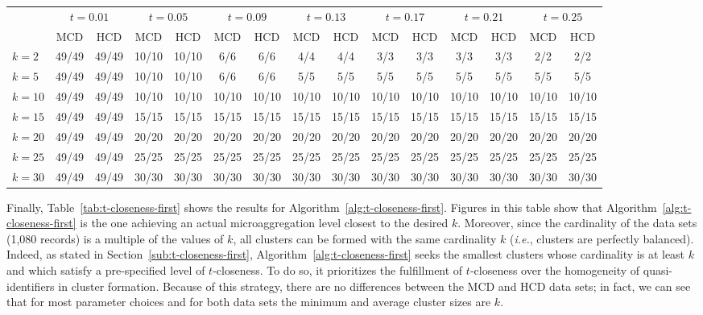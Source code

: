 \documentclass[10pt,journal,compsoc]{IEEEtran}
\theoremstyle{definition}
\theoremstyle{plain}
\begin{document}
\begin{table*}
\caption{\label{tab:t-closeness-first}Algorithm~\ref{alg:t-closeness-first}: actual microaggregation (minimum and average
size of the clusters, respectively) resulting for several values of $k$ and $t$ for the MCD and HCD data sets.}
\centering
\scriptsize
\begin{tabular}{|l|cc|cc|cc|cc|cc|cc|cc|}\hline
 & \multicolumn{2}{c|}{$t=0.01$} & \multicolumn{2}{c|}{$t=0.05$} & \multicolumn{2}{c|}{$t=0.09$} & \multicolumn{2}{c|}{$t=0.13$} & \multicolumn{2}{c|}{$t=0.17$} & \multicolumn{2}{c|}{$t=0.21$} & \multicolumn{2}{c|}{$t=0.25$}\\
& MCD & HCD & MCD & HCD & MCD & HCD & MCD & HCD & MCD & HCD & MCD & HCD & MCD & HCD\\
\hline
$k=2$ & 49/49 & 49/49  & 10/10 & 10/10  & 6/6 & 6/6 & 4/4 & 4/4 & 3/3 & 3/3 & 3/3 & 3/3 & 2/2 & 2/2 \\
$k=5$ & 49/49 & 49/49  & 10/10 & 10/10  & 6/6 & 6/6 & 5/5 & 5/5 & 5/5 & 5/5 & 5/5 & 5/5 & 5/5 & 5/5 \\
$k=10$ & 49/49 & 49/49  & 10/10 & 10/10  & 10/10 & 10/10 & 10/10 & 10/10 & 10/10 & 10/10 & 10/10 & 10/10 & 10/10 & 10/10 \\
$k=15$ & 49/49 & 49/49  & 15/15 & 15/15  & 15/15 & 15/15 & 15/15 & 15/15 & 15/15 & 15/15 & 15/15 & 15/15 & 15/15 & 15/15 \\
$k=20$ & 49/49 & 49/49  & 20/20 & 20/20  & 20/20 & 20/20 & 20/20 & 20/20 & 20/20 & 20/20 & 20/20 & 20/20 & 20/20 & 20/20 \\
$k=25$ & 49/49 & 49/49  & 25/25 & 25/25  & 25/25 & 25/25 & 25/25 & 25/25 & 25/25 & 25/25 & 25/25 & 25/25 & 25/25 & 25/25 \\
$k=30$ & 49/49 & 49/49  & 30/30 & 30/30  & 30/30 & 30/30 & 30/30 & 30/30 & 30/30 & 30/30 & 30/30 & 30/30 & 30/30 & 30/30 \\
\hline
\end{tabular}
\end{table*}

Finally, Table~\ref{tab:t-closeness-first} shows the results for Algorithm~\ref{alg:t-closeness-first}.
Figures in this table show that Algorithm~\ref{alg:t-closeness-first}
is the one achieving an actual microaggregation level closest to 
the desired $k$.
Moreover, since the cardinality of the data sets (1,080 records) is a multiple of the values of $k$,
all clusters can be formed with the same cardinality $k$ ({\em i.e.}, clusters are perfectly balanced).
Indeed, as stated in Section~\ref{sub:t-closeness-first},
Algorithm~\ref{alg:t-closeness-first} 
seeks the smallest clusters whose cardinality 
is at least $k$ and which satisfy a 
pre-specified level of $t$-closeness. 
To do so, it prioritizes the fulfillment of 
$t$-closeness over the homogeneity of quasi-identifiers 
in cluster formation. Because of this strategy,
there are no differences between the MCD and HCD data sets;
in fact, we can see that for most parameter choices and for both data sets
the minimum and average cluster sizes are $k$.
\end{document}
